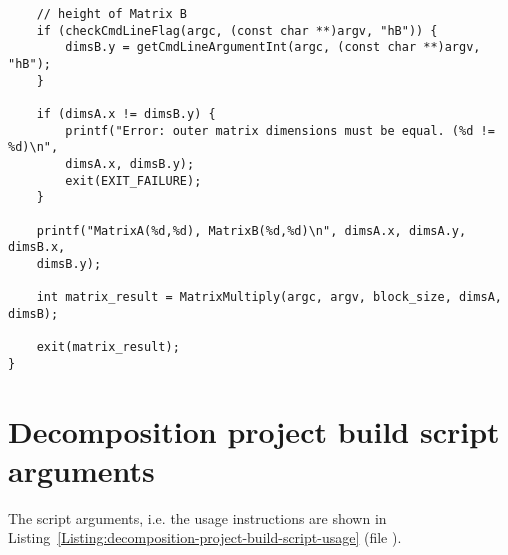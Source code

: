 \begin{lstlisting}
	// height of Matrix B
	if (checkCmdLineFlag(argc, (const char **)argv, "hB")) {
		dimsB.y = getCmdLineArgumentInt(argc, (const char **)argv, "hB");
	}
	
	if (dimsA.x != dimsB.y) {
		printf("Error: outer matrix dimensions must be equal. (%d != %d)\n",
		dimsA.x, dimsB.y);
		exit(EXIT_FAILURE);
	}
	
	printf("MatrixA(%d,%d), MatrixB(%d,%d)\n", dimsA.x, dimsA.y, dimsB.x,
	dimsB.y);
	
	int matrix_result = MatrixMultiply(argc, argv, block_size, dimsA, dimsB);
	
	exit(matrix_result);
}
\end{lstlisting}




\chapter{Decomposition project build script arguments}\label{Attachment:decomposition-project-build-script-parameters}
The  script arguments, i.e. the usage instructions are shown in Listing~\ref{Listing:decomposition-project-build-script-usage} (file ).
